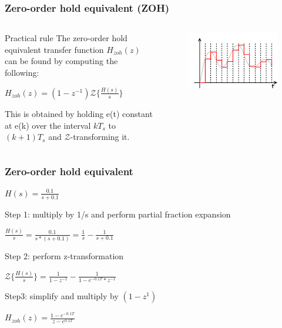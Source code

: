 \begin{frame}
	\frametitle{Zero-order hold equivalent (ZOH)}
\begin{columns}
	\begin{column}{0.5\textwidth}
	\begin{block}{Practical rule}
		The zero-order hold equivalent transfer function $H_{zoh}(z)$ can be found by computing the following:
		\begin{center}
			$H_{zoh}(z) = (1 - z^{-1}) \mathcal{Z}\{\frac{H(s)}{s}\}$
		\end{center}
		This is obtained by holding e(t) constant at e(k) over the interval $kT_s$ to $(k+1)T_s$ and $\mathcal{Z}$-transforming it.
	\end{block}
	\end{column}
	
	\begin{column}{0.5\textwidth}
		\begin{figure}
			\centering
			\includegraphics[width=1\linewidth]{zero-order}
		\end{figure}
	\end{column}
\end{columns}
\end{frame}

\begin{frame}
	\frametitle{Zero-order hold equivalent}
	\begin{example}
		\begin{center}
			$H(s) = \frac{0.1}{s + 0.1}$
		\end{center}
		Step 1: multiply by 1/s and perform partial fraction expansion
		\begin{center}
			$\frac{H(s)}{s} = \frac{0.1}{s * (s + 0.1)} = \frac{1}{s} - \frac{1}{s + 0.1}$
		\end{center}
		Step 2: perform z-transformation
		\begin{center}
			$\mathcal{Z} \{\frac{H(s)}{s}\} = \frac{1}{1 - z^{-1}} - \frac{1}{1 - e^{-0.1T} * z^{-1}}$
		\end{center}
		Step3: simplify and multiply by $(1-z^{1})$
		\begin{center}
			$H_{zoh}(z) = \frac{1 - e^{-0.1T}}{z - e^{0.1T}}$
		\end{center}
	\end{example}
\end{frame}

